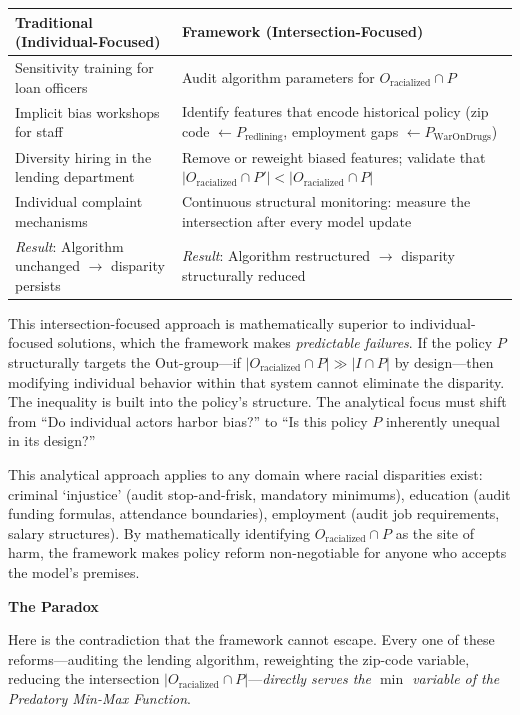 \medskip
\noindent
\begin{tabular}{@{}p{}|p{}@{}}
\textbf{Traditional (Individual-Focused)} & \textbf{Framework (Intersection-Focused)} \\
\hline
Sensitivity training for loan officers & Audit algorithm parameters for $O_{\text{racialized}} \cap P$ \\[4pt]
Implicit bias workshops for staff & Identify features that encode historical policy (zip code $\leftarrow P_{\text{redlining}}$, employment gaps $\leftarrow P_{\text{WarOnDrugs}}$) \\[4pt]
Diversity hiring in the lending department & Remove or reweight biased features; validate that $|O_{\text{racialized}} \cap P'| < |O_{\text{racialized}} \cap P|$ \\[4pt]
Individual complaint mechanisms & Continuous structural monitoring: measure the intersection after every model update \\[4pt]
\textit{Result}: Algorithm unchanged $\rightarrow$ disparity persists & \textit{Result}: Algorithm restructured $\rightarrow$ disparity structurally reduced \\
\end{tabular}

\medskip
This intersection-focused approach is mathematically superior to individual-focused solutions, which the framework makes \textit{predictable failures}. If the policy $P$ structurally targets the Out-group---if $|O_{\text{racialized}} \cap P| \gg |I \cap P|$ by design---then modifying individual behavior within that system cannot eliminate the disparity. The inequality is built into the policy's structure. The analytical focus must shift from ``Do individual actors harbor bias?'' to ``Is this policy $P$ inherently unequal in its design?''

This analytical approach applies to any domain where racial disparities exist: criminal `injustice' (audit stop-and-frisk, mandatory minimums), education (audit funding formulas, attendance boundaries), employment (audit job requirements, salary structures). By mathematically identifying $O_{\text{racialized}} \cap P$ as the site of harm, the framework makes policy reform non-negotiable for anyone who accepts the model's premises.

\medskip
\textbf{The Paradox}

\medskip
Here is the contradiction that the framework cannot escape. Every one of these reforms---auditing the lending algorithm, reweighting the zip-code variable, reducing the intersection $|O_{\text{racialized}} \cap P|$---\textit{directly serves the $\min$ variable of the Predatory Min-Max Function}.


